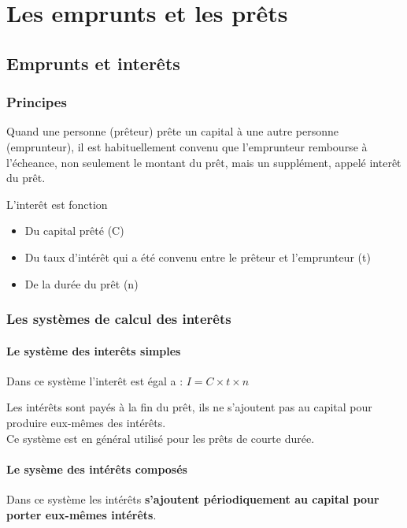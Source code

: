 \chapter{Les emprunts et les prêts}
	\section{Emprunts et interêts}
	\subsection{Principes}
	Quand une personne (prêteur) prête un capital à une autre personne (emprunteur), il est habituellement convenu que l'emprunteur rembourse à l'écheance, non seulement le montant du prêt, mais un 
	supplément, appelé interêt du prêt.

	L'interêt est fonction
	\begin{itemize}
		\item Du capital prêté (C)
		\item Du taux d'intérêt qui a été convenu entre le prêteur et l'emprunteur (t)
		\item De la durée du prêt (n)
	\end{itemize}
	\subsection{Les systèmes de calcul des interêts}
	\subsubsection{Le système des interêts simples}
	Dans ce système l'interêt est égal a : $ I = C \times t \times n$

	Les intérêts sont payés à la fin du prêt, ils ne s'ajoutent pas au capital pour produire eux-mêmes des intérêts.\\
	Ce système est en général utilisé pour les prêts de courte durée.

	\subsubsection{Le sysème des intérêts composés}
	Dans ce système les intérêts \textbf{s'ajoutent périodiquement au capital pour porter eux-mêmes intérêts}.
